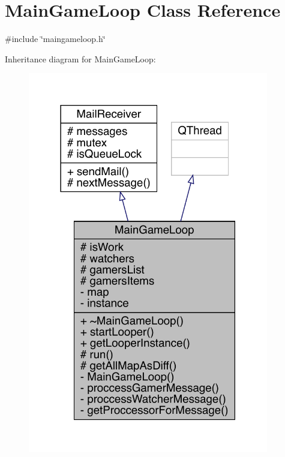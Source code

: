 \hypertarget{a00209}{}\section{Main\+Game\+Loop Class Reference}
\label{a00209}


{\ttfamily \#include \char`\"{}maingameloop.\+h\char`\"{}}



Inheritance diagram for Main\+Game\+Loop\+:
\nopagebreak
\begin{figure}[H]
\begin{center}
\leavevmode
\includegraphics[width=298pt]{dc/d31/a00208}
\end{center}
\end{figure}


